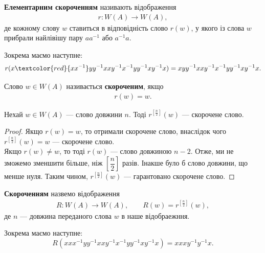 \documentclass{math_library}
\begin{document}
\begin{definition}
\textbf{Елементарним скороченням} називають відображення
\begin{align*}
r \colon W(A) \to W(A),
\end{align*}
де кожному слову $w$ ставиться в відповідність слово $r(w)$, у якого із слова $w$ прибрали найлівішу пару $aa^{-1}$ або $a^{-1}a$.
\end{definition}

\begin{example}
Зокрема маємо наступне:
\[
r(x\textcolor{red}{xx^{-1}}yy^{-1}xxy^{-1}x^{-1}yy^{-1}xy^{-1}x) = xyy^{-1}xxy^{-1}x^{-1}yy^{-1}xy^{-1}x.
\]
\end{example}

\begin{definition}
Слово $w \in W(A)$ називається \textbf{скороченим}, якщо
\begin{align*}
r(w) = w.
\end{align*}
\end{definition}

\begin{lemma}
Нехай $w \in W(A)$ --- слово довжини $n$. Тоді $r^{\left[ \frac{n}{2} \right]}(w)$ --- скорочене слово.
\end{lemma}

\begin{proof}
Якщо $r(w) = w$, то отримали скорочене слово, внаслідок чого $r^{\left[ \frac{n}{2} \right]}(w) = w$ --- скорочене слово.\\
Якщо $r(w) \neq w$, то тоді $r(w)$ --- слово довжиною $n-2$. Отже, ми не зможемо зменшити більше, ніж $\left[ \dfrac{n}{2} \right]$ разів. Інакше було б слово довжини, що менше нуля. Таким чином, $r^{\left[ \frac{n}{2} \right]}(w)$ --- гарантовано скорочене слово.
\end{proof}

\begin{definition}
\textbf{Скороченням} назвемо відображення
\begin{align*}
R \colon W(A) \to W(A), \qquad R(w) = r^{\left[\frac{n}{2}\right]}(w),
\end{align*}
де $n$ --- довжина переданого слова $w$ в наше відобраежння.
\end{definition}

\begin{example}
Зокрема маємо наступне:
\[ 
R(xxx^{-1}yy^{-1}xxy^{-1}x^{-1}yy^{-1}xy^{-1}x) = xxxy^{-1}y^{-1}x.
\]
\end{example}
\end{document}
